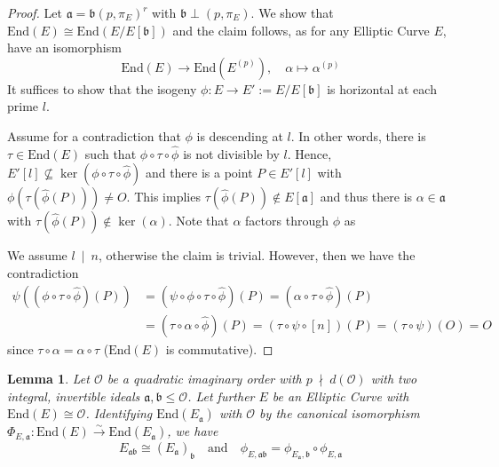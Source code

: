 \documentclass{scrartcl}
\newcommand{\End}{\mathrm{End}}
\newcommand{\divides}{\ \mid \ }
\newcommand{\notdivides}{\ \nmid \ }
\newcommand{\IdPoint}{O}
\renewcommand{\a}{\mathfrak{a}}
\renewcommand{\b}{\mathfrak{b}}
\renewcommand{\O}{\mathcal{O}}
\newtheorem{lemma}[prop]{Lemma}
\theoremstyle{definition}
\begin{document}
\begin{proof}
    Let $\a = \b(p, \pi_E)^r$ with $\b \perp (p, \pi_E)$.
    We show that $\End(E) \cong \End(E/E[\b])$ and the claim follows, as for any Elliptic Curve $E$, have an isomorphism
    \begin{equation*}
        \End(E) \to \End(E^{(p)}), \quad \alpha \mapsto \alpha^{(p)}
    \end{equation*}
    It suffices to show that the isogeny $\phi: E \to E' := E/E[\b]$ is horizontal at each prime $l$.

    Assume for a contradiction that $\phi$ is descending at $l$.
    In other words, there is $\tau \in \End(E)$ such that $\phi \circ \tau \circ \hat{\phi}$ is not divisible by $l$.
    Hence, $E'[l] \not\subseteq \ker(\phi \circ \tau \circ \hat{\phi})$ and there is a point $P \in E'[l]$ with $\phi(\tau(\hat{\phi}(P))) \neq \IdPoint$.
    This implies $\tau(\hat{\phi}(P)) \notin E[\a]$ and thus there is $\alpha \in \a$ with $\tau(\hat{\phi}(P)) \notin \ker(\alpha)$.
    Note that $\alpha$ factors through $\phi$ as
    \begin{center}
    \end{center}
    We assume $l \divides n$, otherwise the claim is trivial.
    However, then we have the contradiction
    \begin{align*}
        \psi((\phi \circ \tau \circ \hat{\phi})(P)) &= (\psi \circ \phi \circ \tau \circ \hat{\phi})(P) = (\alpha \circ \tau \circ \hat{\phi})(P) \\
        &= (\tau \circ \alpha \circ \hat{\phi})(P) = (\tau \circ \psi \circ [n])(P) = (\tau \circ \psi)(\IdPoint) = \IdPoint
    \end{align*}
    since $\tau \circ \alpha = \alpha \circ \tau$ ($\End(E)$ is commutative).
\end{proof}
\begin{lemma}
    Let $\O$ be a quadratic imaginary order with $p \notdivides d(\O)$ with two integral, invertible ideals $\a, \b \leq \O$.
    Let further $E$ be an Elliptic Curve with $\End(E) \cong \O$.
    Identifying $\End(E_\a)$ with $\O$ by the canonical isomorphism $\Phi_{E, \a}: \End(E) \overset{\sim}{\longrightarrow} \End(E_\a)$, we have
    \begin{equation*}
        E_{\a\b} \cong (E_\a)_\b \quad \text{and} \quad \phi_{E, \a\b} = \phi_{E_\a, \b} \circ \phi_{E, \a}
    \end{equation*}
\end{lemma}
\end{document}
